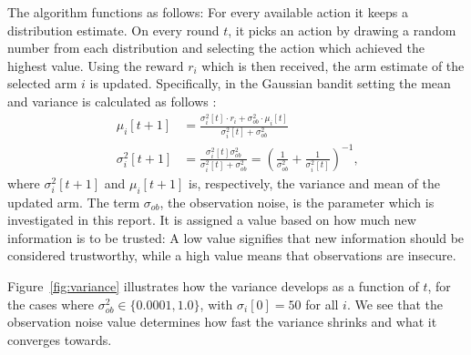 The algorithm functions as follows: For every available action it keeps a distribution estimate.
On every round $t$, it picks an action by drawing a random number from each distribution and selecting the action which achieved the highest value.
Using the reward $r_i$ which is then received, the arm estimate of the selected arm $i$ is updated.
Specifically, in the Gaussian bandit setting the mean and variance is calculated as follows \cite{Murphy2007}:
\begin{align*}
    \mu_i [t + 1] &= \frac{\sigma_i^2 [t] \cdot r_i + \sigma_{ob}^2 \cdot \mu_i [t]}{\sigma_i^2 [t] + \sigma_{ob}^2} \\
    \sigma_i^2 [t + 1] &= \frac{\sigma_i^2 [t] \sigma_{ob}^2}{\sigma_i^2 [t] + \sigma_{ob}^2} = \left(\frac{1}{\sigma_{ob}^2} + \frac{1}{\sigma_i^2 [t]} \right)^{-1} \text{,}
\end{align*}
where $\sigma_i^2 [t + 1]$ and $\mu_i [t + 1]$ is, respectively, the variance and mean of the updated arm.
The term $\sigma_{ob}$, the observation noise, is the parameter which is investigated in this report.
It is assigned a value based on how much new information is to be trusted: A low value signifies that new information should be considered trustworthy, while a high value means that observations are insecure.

Figure~\ref{fig:variance} illustrates how the variance develops as a function of $t$, for the cases where $\sigma_{ob}^2 \in \{0.0001, 1.0\}$, with $\sigma_i [0] = 50$ for all $i$.
We see that the observation noise value determines how fast the variance shrinks and what it converges towards.

